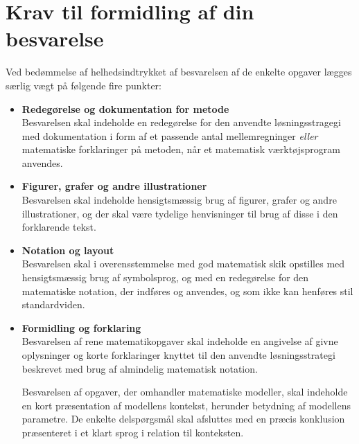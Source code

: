 \documentclass[12pt,x11names,a4paper]{article}
\begin{document}
\section*{Krav til formidling af din besvarelse}

Ved bedømmelse af helhedsindtrykket af besvarelsen af de enkelte opgaver lægges særlig vægt på følgende fire punkter:
\begin{itemize}
\item[$\cdot$] \textbf{Redegørelse og dokumentation for metode} \\
Besvarelsen skal indeholde en redegørelse for den anvendte løsningsstragegi med dokumentation i form af et passende antal mellemregninger \textit{eller} matematiske forklaringer på metoden, når et matematisk værktøjsprogram anvendes.
\item[$\cdot$] \textbf{Figurer, grafer og andre illustrationer} \\
Besvarelsen skal indeholde hensigtsmæssig brug af figurer, grafer og andre illustrationer, og der skal være tydelige henvisninger til brug af disse i den forklarende tekst.
\item[$\cdot$] \textbf{Notation og layout}\\
Besvarelsen skal i overensstemmelse med god matematisk skik opstilles med hensigtsmæssig brug af symbolsprog, og med en redegørelse for den matematiske notation, der indføres og anvendes, og som ikke kan henføres stil standardviden.
\item[$\cdot$] \textbf{Formidling og forklaring}\\
Besvarelsen af rene matematikopgaver skal indeholde en angivelse af givne oplysninger og korte forklaringer knyttet til den anvendte løsningsstrategi beskrevet med brug af almindelig matematisk notation. 

Besvarelsen af opgaver, der omhandler matematiske modeller, skal indeholde en kort præsentation af modellens kontekst, herunder betydning af modellens parametre. De enkelte delspørgsmål skal afsluttes med en præcis konklusion præsenteret i et klart sprog i relation til konteksten.
\end{itemize}

\newpage
\end{document}
